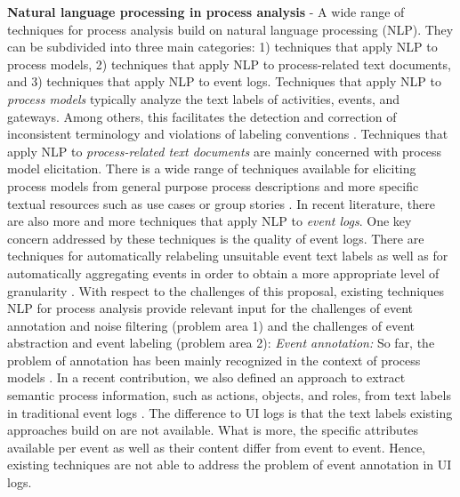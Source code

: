\textbf{Natural language processing in process analysis} - A wide range of techniques for process analysis build on natural language processing (NLP). They can be subdivided into three main categories: 1) techniques that apply NLP to process models, 2) techniques that apply NLP to process-related text documents, and 3) techniques that apply NLP to event logs. Techniques that apply NLP to \textit{process models} typically analyze the text labels of activities, events, and gateways. Among others, this facilitates the detection and correction of inconsistent terminology \cite{koschmider2007user,pittke2015automatic} and violations of labeling conventions \cite{becker2009towards,leopold2013detection}. Techniques that apply NLP to \textit{process-related text documents} are mainly concerned with process model elicitation. There is a wide range of techniques available for eliciting process models from general purpose process descriptions \cite{ghose2007process,friedrich2011process,epure2015automatic} and more specific textual resources such as use cases \cite{sinha2010use} or group stories  \cite{de2009business}. In recent literature, there are also more and more techniques that apply NLP to \textit{event logs}. One key concern addressed by these techniques is the quality of event logs. There are techniques for automatically relabeling unsuitable event text labels \cite{ramos2021nlp} as well as for automatically aggregating events in order to obtain a more appropriate level of granularity \cite{deokar2015semantics}. With respect to the challenges of this proposal, existing techniques NLP for process analysis provide relevant input for the challenges of event annotation and noise filtering (problem area 1) and the challenges of event abstraction and event labeling (problem area 2): 
\vspace{0.2em}
\newline%
\noindent \textit{Event annotation:} So far, the problem of annotation has been mainly recognized in the context of process models \cite{leopold2013detection}. In a recent contribution, we also defined an approach to extract semantic process information, such as actions, objects, and roles, from text labels in traditional event logs \cite{rebmann2021extracting}. The difference to UI logs is that the text labels existing approaches build on are not available. What is more, the specific attributes available per event as well as their content differ from event to event. Hence, existing techniques are not able to address the problem of event annotation in UI logs. 
\vspace{0.2em}
